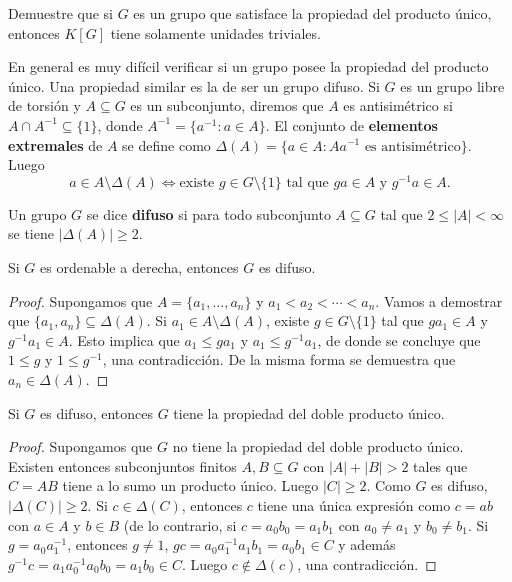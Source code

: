 \begin{exercise}
	Demuestre que si $G$ es un grupo que satisface la propiedad del producto
	único, entonces $K[G]$ tiene solamente unidades triviales.
\end{exercise}

En general es muy difícil verificar si un grupo posee la propiedad del producto
único. Una propiedad similar es la de ser un grupo difuso. Si $G$ es un grupo
libre de torsión y $A\subseteq G$ es un subconjunto, diremos que $A$ es
antisimétrico si $A\cap A^{-1}\subseteq\{1\}$, donde $A^{-1}=\{a^{-1}:a\in
A\}$. El conjunto de \textbf{elementos extremales} de $A$ se define como
$\Delta(A)=\{a\in A:Aa^{-1}\text{ es antisimétrico}\}$. Luego
\[
	a\in A\setminus\Delta(A)
	\Longleftrightarrow
	\text{existe $g\in G\setminus\{1\}$ tal que $ga\in A$ y $g^{-1}a\in A$}.
\]

\begin{definition}
	Un grupo $G$ se dice \textbf{difuso} si para todo subconjunto $A\subseteq
	G$ tal que $2\leq |A|<\infty$ se tiene $|\Delta(A)|\geq2$.
\end{definition}

\begin{lemma}
	Si $G$ es ordenable a derecha, entonces $G$ es difuso.	
\end{lemma}

\begin{proof}
	Supongamos que $A=\{a_1,\dots,a_n\}$ y $a_1<a_2<\cdots<a_n$. Vamos a
	demostrar que $\{a_1,a_n\}\subseteq\Delta(A)$. Si $a_1\in
	A\setminus\Delta(A)$, existe $g\in G\setminus\{1\}$ tal que $ga_1\in A$ y
	$g^{-1}a_1\in A$. Esto implica que $a_1\leq ga_1$ y $a_1\leq g^{-1}a_1$, de
	donde se concluye que $1\leq g$ y $1\leq g^{-1}$, una contradicción. De la
	misma forma se demuestra que $a_n\in \Delta(A)$.
\end{proof}

\begin{lemma}
	\label{lemma:difuso=>2up}
	Si $G$ es difuso, entonces $G$ tiene la propiedad del doble producto único.	
\end{lemma}

\begin{proof}
	Supongamos que $G$ no tiene la propiedad del doble producto único. Existen
	entonces subconjuntos finitos $A,B\subseteq G$ con $|A|+|B|>2$ tales que
	$C=AB$ tiene a lo sumo un producto único. Luego $|C|\geq2$. Como $G$ es
	difuso, $|\Delta(C)|\geq2$. Si $c\in\Delta(C)$, entonces $c$ tiene una
	única expresión como $c=ab$ con $a\in A$ y $b\in B$ (de lo contrario, si
	$c=a_0b_0=a_1b_1$ con $a_0\ne a_1$ y $b_0\ne b_1$. Si $g=a_0a_1^{-1}$,
	entonces $g\ne 1$, $gc=a_0a_1^{-1}a_1b_1=a_0b_1\in C$ y además
	$g^{-1}c=a_1a_0^{-1}a_0b_0=a_1b_0\in C$. Luego $c\not\in\Delta(c)$, una
	contradicción.
\end{proof}

